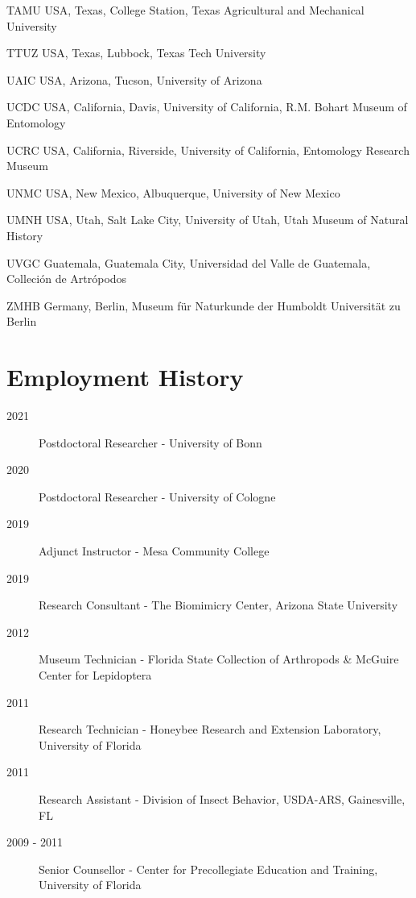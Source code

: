 \documentclass[12pt,a4paper]{article}
\begin{document}
\begin{collections}
			\item [TAMU] USA, Texas, College Station, Texas Agricultural and Mechanical University
			\item [TTUZ] USA, Texas, Lubbock, Texas Tech University
			\item [UAIC] USA, Arizona, Tucson, University of Arizona
			\item [UCDC] USA, California, Davis, University of California, R.M. Bohart Museum of Entomology
			\item [UCRC] USA, California, Riverside, University of California, Entomology Research Museum
			\item [UNMC] USA, New Mexico, Albuquerque, University of New Mexico
			\item [UMNH] USA, Utah, Salt Lake City, University of Utah, Utah Museum of Natural History
			\item [UVGC] Guatemala, Guatemala City, Universidad del Valle de Guatemala, Colleci\'{o}n de Artr\'{o}podos
			\item [ZMHB] Germany, Berlin, Museum f\"{u}r Naturkunde der Humboldt Universit\"{a}t zu Berlin
		\end{collections}

\section*{Employment History}
	\begin{description}
		\item [2021] Postdoctoral Researcher - University of Bonn
		\item [2020] Postdoctoral Researcher - University of Cologne
		\item [2019] Adjunct Instructor - Mesa Community College
		\item [2019] Research Consultant - The Biomimicry Center, Arizona State University
		\item [2012] Museum Technician - Florida State Collection of Arthropods \& McGuire Center for Lepidoptera
		\item [2011] Research Technician - Honeybee Research and Extension Laboratory, University of Florida
		\item [2011] Research Assistant - Division of Insect Behavior, USDA-ARS, Gainesville, FL
		\item [2009 - 2011] Senior Counsellor - Center for Precollegiate Education and Training, University of Florida
	\end{description}
\end{document}
